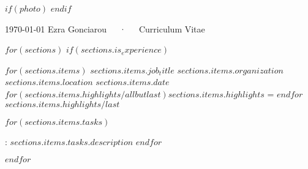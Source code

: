 \documentclass[11pt, a4paper]{templates/template}
\begin{document}
$if(photo)$
$endif$
\address{$contacts.location$}



\makecvheader [L]

\makecvfooter
  {\today}
  {Ezra Gonciarou~~~·~~~Curriculum Vitae}
  {\thepage}

$for(sections)$
$if(sections.is_experience)$
    \begin{cventries}
    $for(sections.items)$
        \cventry
            {$sections.items.job_title$}
            {$sections.items.organization$ \href{$sections.items.url$}{\faGlobe {}}}
            {$sections.items.location$}
            {$sections.items.date$}
            $for(sections.items.highlights/allbutlast)${$sections.items.highlights$ = }$endfor${$sections.items.highlights/last$}
            {
            \begin{cvitems} %
                $for(sections.items.tasks)$
                \item {: $sections.items.tasks.description$}
                $endfor$
            \end{cvitems}
            \vspace{4.0mm}
            \begin{cvsubentries}
            \end{cvsubentries}
            }
            \vspace{4.0mm}
    $endfor$
    \end{cventries}
\end{document}
